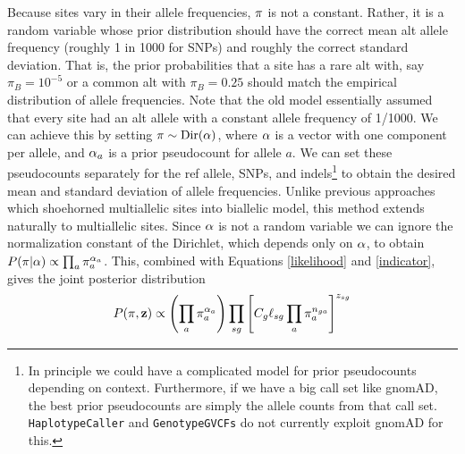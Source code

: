 \documentclass[nofootinbib,amssymb,amsmath]{revtex4}
\newcommand{\vz}{{\bf z}}
\newcommand{\vpi}{{\bf \pi}}
\newcommand{\valpha}{{\bf \alpha}}
\newcommand{\code}[1]{\texttt{#1}}
\begin{document}
Because sites vary in their allele frequencies, $\vpi$ is not a constant.  Rather, it is a random variable whose prior distribution should have the correct mean alt allele frequency (roughly 1 in 1000 for SNPs) and roughly the correct standard deviation.  That is, the prior probabilities that a site has a rare alt with, say $\pi_B = 10^{-5}$ or a common alt with $\pi_B = 0.25$ should match the empirical distribution of allele frequencies.  Note that the old model essentially assumed that every site had an alt allele with a constant allele frequency of 1/1000.  We can achieve this by setting $\vpi \sim {\rm Dir}(\valpha)$, where $\valpha$ is a vector with one component per allele, and $\valpha_a$ is a prior pseudocount for allele $a$.  We can set these pseudocounts separately for the ref allele, SNPs, and indels\footnote{In principle we could have a complicated model for prior pseudocounts depending on context.  Furthermore, if we have a big call set like gnomAD, the best prior pseudocounts are simply the allele counts from that call set.  \code{HaplotypeCaller} and \code{GenotypeGVCFs} do not currently exploit gnomAD for this.} to obtain the desired mean and standard deviation of allele frequencies.  Unlike previous approaches which shoehorned multiallelic sites into  biallelic model, this method extends naturally to multiallelic sites.  Since $\valpha$ is not a random variable we can ignore the normalization constant of the Dirichlet, which depends only on $\valpha$, to obtain $P(\vpi | \valpha) \propto  \prod_a \pi_a^{\alpha_a}$.  This, combined with Equations \ref{likelihood} and \ref{indicator}, gives the joint posterior distribution
\begin{equation}
P(\vpi, \vz) \propto \left( \prod_a \pi_a^{\alpha_a} \right) \prod_{sg} \left[ C_g \ell_{sg} \prod_a \pi_a^{n_{ga}} \right]^{z_{sg}}
\end{equation}
\end{document}
